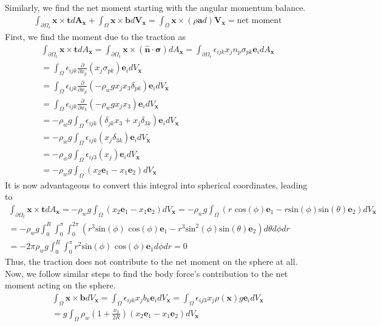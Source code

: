 Similarly, we find the net moment starting with the angular momentum balance.
\begin{gather*}
    \int_{\partial\Omega_t}\bm{x}\times\bm{t}d\bm{A_x}+\int_\Omega\bm{x}\times\bm{b}d\bm{V_x}=\int_\Omega\bm{x}\times(\rho\bm{a}d)\bm{V_x}=\text{net moment}
\end{gather*}
First, we find the moment due to the traction as
\begin{gather*}
    \int_{\partial\Omega_t}\bm{x}\times\bm{t}dA\bm{_x}=\int_{\partial\Omega_t}\bm{x}\times(\hat{\bm{n}}\cdot\bm{\sigma})dA\bm{_x}=\int_{\partial\Omega_t}\epsilon_{ijk}x_j n_p \sigma_{pk}\bm{e}_idA\bm{_x}\\
    =\int_{\Omega}\epsilon_{ijk}\frac{\partial}{\partial x_p}(x_j \sigma_{pk})\bm{e}_idV\bm{_x}\\
    =\int_{\Omega}\epsilon_{ijk}\frac{\partial}{\partial x_p}(-\rho_w g x_j x_3\delta_{pk})\bm{e}_idV\bm{_x}\\
    =\int_{\Omega}\epsilon_{ijk}\frac{\partial}{\partial x_k}(-\rho_w g x_j x_3)\bm{e}_idV\bm{_x}\\
    =-\rho_w g\int_{\Omega}\epsilon_{ijk}(\delta_{jk} x_3+x_j\delta_{3k})\bm{e}_idV\bm{_x}\\
    =-\rho_w g\int_{\Omega}\epsilon_{ijk}(x_j\delta_{3k})\bm{e}_idV\bm{_x}\\
    =-\rho_w g\int_{\Omega}\epsilon_{ij3}(x_j)\bm{e}_idV\bm{_x}\\
    =-\rho_w g\int_{\Omega}(x_2\bm{e}_1-x_1\bm{e}_2)dV\bm{_x}
\end{gather*}
It is now advantageous to convert this integral into spherical coordinates, leading to
\begin{gather*}
    \int_{\partial\Omega_t}\bm{x}\times\bm{t}dA\bm{_x}=-\rho_w g\int_{\Omega}(x_2\bm{e}_1-x_1\bm{e}_2)dV\bm{_x}=-\rho_w g\int_{\Omega}(r\text{ cos}(\phi)\bm{e}_1-r\text{sin}(\phi)\text{sin}(\theta)\bm{e}_2)dV\bm{_x}\\
    =-\rho_w g\int_0^R\int_0^{\pi}\int_0^{2\pi}(r^3\text{sin}(\phi)\text{ cos}(\phi)\bm{e}_1-r^3\text{sin}^2(\phi)\text{sin}(\theta)\bm{e}_2)d\theta d\phi dr\\
    =-2\pi\rho_w g\int_0^R\int_0^{\pi}r^2\text{sin}(\phi)\text{ cos}(\phi)\bm{e}_1 d\phi dr=0
\end{gather*}
Thus, the traction does not contribute to the net moment on the sphere at all. Now, we follow similar steps to find the body force's contribution to the net moment acting on the sphere.
\begin{gather*}
    \int_\Omega\bm{x}\times\bm{b}dV\bm{_x}=\int_{\Omega}\epsilon_{ijk}x_jb_k\bm{e}_idV\bm{_x}=\int_{\Omega}\epsilon_{ij3}x_j\rho(\bm{x})g\bm{e}_idV\bm{_x}\\
    =g\int_{\Omega}\rho_w(1+\frac{x_2}{2R})(x_2\bm{e}_1-x_1\bm{e}_2)dV\bm{_x}
\end{gather*}
